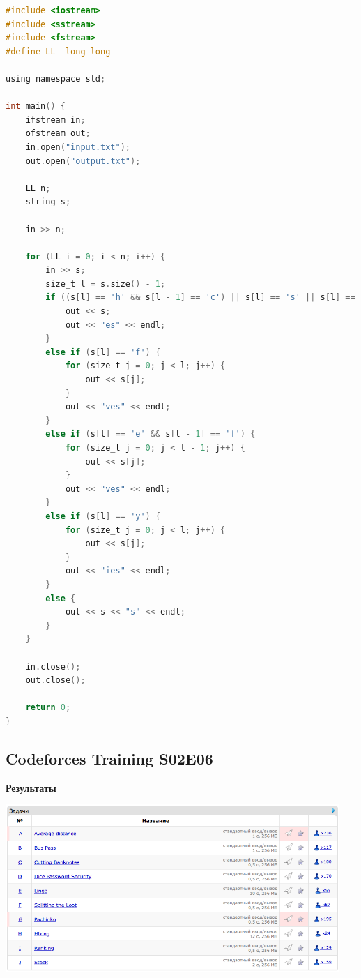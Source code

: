 \documentclass[a4paper,12pt]{article}
\begin{document}
\begin{lstlisting}[language=C]
#include <iostream>
#include <sstream>
#include <fstream>
#define LL  long long

using namespace std;

int main() {
    ifstream in;
    ofstream out;
    in.open("input.txt");
    out.open("output.txt");

    LL n;
    string s;
    
    in >> n;
    
    for (LL i = 0; i < n; i++) {
        in >> s;
        size_t l = s.size() - 1;
        if ((s[l] == 'h' && s[l - 1] == 'c') || s[l] == 's' || s[l] == 'x' || s[l] == 'o') {
            out << s;
            out << "es" << endl;
        }
        else if (s[l] == 'f') {
            for (size_t j = 0; j < l; j++) {
                out << s[j];
            }
            out << "ves" << endl;
        }
        else if (s[l] == 'e' && s[l - 1] == 'f') {
            for (size_t j = 0; j < l - 1; j++) {
                out << s[j];
            }
            out << "ves" << endl;
        }
        else if (s[l] == 'y') {
            for (size_t j = 0; j < l; j++) {
                out << s[j];
            }
            out << "ies" << endl;
        }
        else {
            out << s << "s" << endl;
        }
    }
    
    in.close();
    out.close();
    
    return 0;
}
\end{lstlisting}



%
%
\newpage
\subsection{Codeforces Training S02E06}

\textbf{{\large Результаты}} \\
\begin{center}
\includegraphics[width=0.95\textwidth]{CT_S02E06/CT_S02E06_result.png}\\ [1cm]
\end{center}
\end{document}
